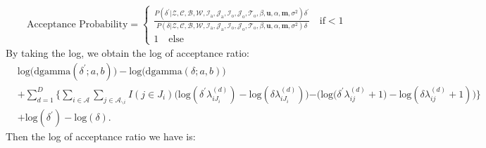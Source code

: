\documentclass[a4paper]{article}
\begin{document}
\begin{equation} 
	\begin{split}
		& \mbox{Acceptance Probability}=
		\begin{cases}  \frac{P(\delta^\prime|\mathcal{Z},   \mathcal{C},  \mathcal{B}, \mathcal{W}, \mathcal{I}_{\mbox{a}}, \mathcal{J}_{\mbox{a}}, \mathcal{I}_{\mbox{o}}, \mathcal{J}_{\mbox{o}}, \mathcal{T}_{\mbox{o}}, \beta, \boldsymbol{u}, \alpha, \boldsymbol{m}, \sigma^2)\delta^\prime}{P(\delta|\mathcal{Z},   \mathcal{C},   \mathcal{B}, \mathcal{W}, \mathcal{I}_{\mbox{a}}, \mathcal{J}_{\mbox{a}}, \mathcal{I}_{\mbox{o}}, \mathcal{J}_{\mbox{o}}, \mathcal{T}_{\mbox{o}}, \beta, \boldsymbol{u}, \alpha, \boldsymbol{m}, \sigma^2)\delta}\quad\text{if}  <1\\
			1 \quad \text{else}
		\end{cases}
	\end{split}
\end{equation}
By taking the log, we obtain the log of acceptance ratio:
\begin{equation}
	\begin{aligned} 
		&\mbox{log}\Big(\mbox{dgamma}(\delta^\prime ;a, b)\Big)-\mbox{log}\Big(\mbox{dgamma}(\delta; a, b)\Big)\\&+ \sum_{d=1}^D\Big\{\sum_{i\in \mathcal{A}}\sum_{j \in \mathcal{A}_{\backslash i }} {I(j \in J_i)}\Big(\mbox{log}(\delta^{\prime} \lambda^{(d)}_{iJ_i}) - \mbox{log}(\delta \lambda^{(d)}_{iJ_i})\Big)  {-\Big(\mbox{log}(\delta^{\prime} \lambda^{(d)}_{ij}}+1)
		-\mbox{log}(\delta\lambda^{(d)}_{ij}+1)\Big) \Big\}\\& +\mbox{log}(\delta^\prime) -  \mbox{log}(\delta) .
	\end{aligned}
\end{equation}
Then the log of acceptance ratio we have is:
\end{document}
